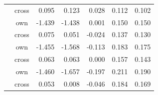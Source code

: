 \begin{tabular}{lcrrrrr}
 & cross & 0.095 & 0.123 & 0.028 & 0.112 & 0.102 \\
\addlinespace
\multirow{2}{*}{$J = 16$} & own & -1.439 & -1.438 & 0.001 & 0.150 & 0.150 \\
 & cross & 0.075 & 0.051 & -0.024 & 0.137 & 0.130 \\
\addlinespace
\multirow{2}{*}{$J = 20$} & own & -1.455 & -1.568 & -0.113 & 0.183 & 0.175 \\
 & cross & 0.063 & 0.063 & 0.000 & 0.157 & 0.143 \\
\addlinespace
\multirow{2}{*}{$J = 24$} & own & -1.460 & -1.657 & -0.197 & 0.211 & 0.190 \\
 & cross & 0.053 & 0.008 & -0.046 & 0.184 & 0.169 \\
\bottomrule
\end{tabular}
